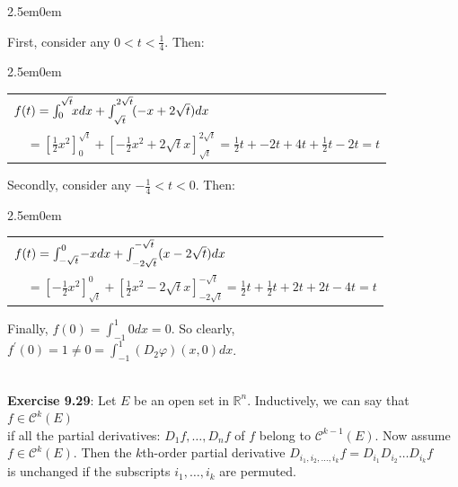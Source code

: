 \documentclass{book}
\newcommand{\exTwo}{%
   \color{RedViolet}%
   \fontsize{13}{15}\selectfont%
}
\newenvironment{myIndent}{%
   \begin{adjustwidth}{2.5em}{0em}%
}{%
   \end{adjustwidth}%
}
\newcommand{\mySepTwo}[1][.]{%
   {\noindent\color{#1}{\rule{6.5in}{0.5mm}}}\\%
}
\newcommand{\retTwo}{\hfill\bigbreak}
\begin{document}
{\begin{myIndent}\exTwo
   First, consider any $0 < t < \frac{1}{4}$. Then:
   \begin{myIndent}
      \begin{tabular}{l}
         $f(t) = \int_0^{\sqrt{t}\vphantom{a_{|_|}}}\hspace{-0.3em}xdx + \int_{\sqrt{t}\vphantom{|^{|^|}}}^{2\sqrt{t}\vphantom{a_{|_|}}}{\hspace{-0.3em}(-x + 2\sqrt{t})dx}$\\ [6pt]

         $\phantom{aa} = [\frac{1}{2}x^2]^{\sqrt{t}}_0 + [-\frac{1}{2}x^2 + 2\sqrt{t}x]^{2\sqrt{t}}_{\sqrt{t}} = \frac{1}{2}t + -2t + 4t + \frac{1}{2}t - 2t = t$
      \end{tabular}\retTwo
   \end{myIndent}

   Secondly, consider any $-\frac{1}{4} < t < 0$. Then:
   \begin{myIndent}
      \begin{tabular}{l}
         $f(t) = \int_{-\sqrt{t}\vphantom{a^{|^|}}}^0\hspace{-0.1em}-xdx + \int_{-2\sqrt{t}\vphantom{|^{|^|}}}^{-\sqrt{t}\vphantom{a_{|_|}}}{\hspace{-0.1em}(x - 2\sqrt{t})dx}$\\ [6pt]

         $\phantom{aa} = [-\frac{1}{2}x^2]_{\sqrt{t}}^0 + [\frac{1}{2}x^2 - 2\sqrt{t}x]_{-2\sqrt{t}}^{-\sqrt{t}} = \frac{1}{2}t  + \frac{1}{2}t + 2t + 2t -4t = t$
      \end{tabular}\retTwo
   \end{myIndent}

   Finally, $f(0) = \int_{-1}^{1}0dx = 0$. So clearly, $f^\prime(0) = 1 \neq 0 = \int_{-1}^1 (D_2\varphi)(x, 0)dx$.\retTwo
\end{myIndent}}

\mySepTwo 

\textbf{Exercise 9.29}: Let $E$ be an open set in $\mathbb{R}^n$. Inductively, we can say that $f \in \mathscr{C}^k(E)$\\ if all the partial derivatives: $D_1f, \ldots, D_nf$ of $f$ belong to $\mathscr{C}^{k-1}(E)$. Now assume\\ $f \in \mathscr{C}^k(E)$. Then the $k$th-order partial derivative $D_{i_1,i_2,\ldots,i_k}f = D_{i_1}D_{i_2}\ldots D_{i_k}f$\\ is unchanged if the subscripts $i_1,\ldots, i_k$ are permuted.\\ [-6pt]
\end{document}

